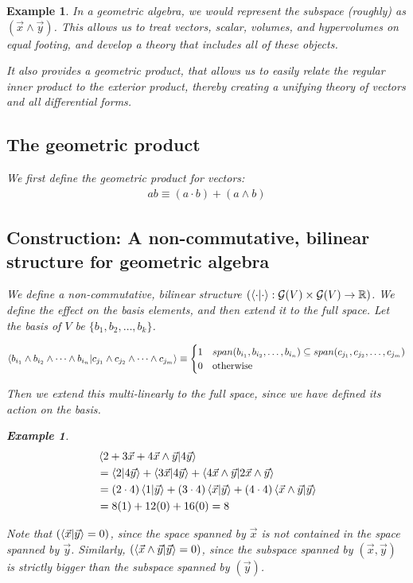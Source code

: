 \documentclass[11pt]{book}
\newcommand{\R}{\ensuremath{\mathbb R}}
\newcommand{\G}{\ensuremath{\mathcal{G}}}
\newtheorem{example}[theorem]{Example}
\begin{document}
\begin{example}
In a geometric algebra, we would represent the subspace (roughly) as $(\vec x \wedge \vec y)$.
This allows us to treat vectors, scalar, volumes, and hypervolumes on
equal footing, and develop a theory that includes all of these objects.

It also provides a \emph{geometric product}, that allows us to easily relate
the regular \emph{inner product} to the \emph{exterior product}, thereby
creating a unifying theory of vectors and all differential forms.

\subsection{The geometric product}

We first define the geometric product for vectors:
\begin{align*}
    ab \equiv (a \cdot b) + (a \wedge b)
\end{align*}


\subsection{Construction: A non-commutative, bilinear structure for geometric algebra}

We define a non-commutative, bilinear structure
$\left(\braket{\cdot}{\cdot}: \G(V) \times \G(V) \rightarrow \R\right)$. We
define the effect on the basis elements, and then extend it to the
full space. Let the basis of $V$ be $\{ b_1, b_2, \dots, b_k \}$.


\begin{align*}
\braket{b_{i_1} \wedge b_{i_2} \wedge \dots \wedge b_{i_n}}{c_{j_1} \wedge c_{j_2} \wedge \dots \wedge c_{j_m}}
\equiv
\begin{cases}
1 & span(b_{i_1}, b_{i_2}, \dots, b_{i_n}) \subseteq span(c_{j_1}, c_{j_2}, \dots, c_{j_m}) \\
0 & \text{otherwise}
\end{cases}
\end{align*}

Then we extend this multi-linearly to the full space, since we have defined its
action on the basis.

\begin{example}
\begin{align*}
&\braket{2 + 3\vec x + 4 \vec x \wedge \vec y}{4\vec y} \\
&= \braket{2}{4\vec y} +
 \braket{3\vec x}{4\vec y} +
 \braket{4 \vec x \wedge \vec y}{2 \vec x \wedge \vec y} \\
&= (2 \cdot 4)\braket{1}{\vec y} + 
   (3 \cdot 4) \braket{\vec x}{\vec y} + 
   (4 \cdot 4) \braket{\vec x \wedge \vec y}{\vec y} \\
&= 8 (1) + 12 (0) + 16 (0) = 8
\end{align*}
\end{example}
Note that $(\braket{\vec x}{\vec y} = 0)$, since the space spanned by $\vec x$
is not contained in the space spanned by $\vec y$. Similarly, 
$(\braket{\vec x \wedge \vec y}{\vec y} = 0)$, since the subspace spanned by
$(\vec x, \vec y)$ is strictly bigger than the subspace spanned by $(\vec y)$.



\end{example}
\end{document}
